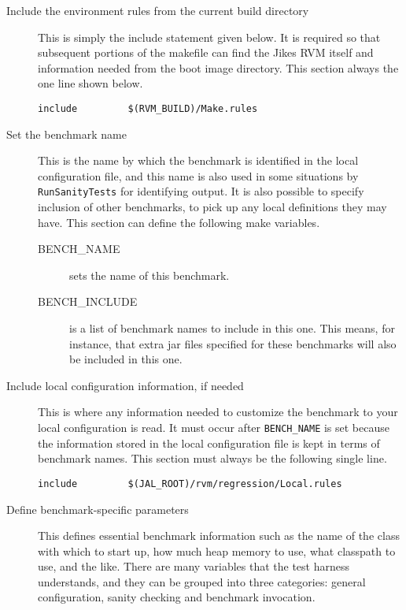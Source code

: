 \begin{description}
\item[Include the environment rules from the current build directory]
This is simply the include statement given below.  It is required so
that subsequent portions of the makefile can find the Jikes RVM itself
and information needed from the boot image directory.  This section
always the one line shown below.
\begin{verbatim}
include         $(RVM_BUILD)/Make.rules
\end{verbatim}

\item[Set the benchmark name] This is the name by which the benchmark
is identified in the local configuration file, and this name is also
used in some situations by {\tt{RunSanityTests}} for identifying
output.  It is also possible to specify inclusion of other benchmarks,
to pick up any local definitions they may have.  This section can
define the following make variables.
\begin{description}
\item[BENCH\_NAME] sets the name of this benchmark.  
\item[BENCH\_INCLUDE] is a list of benchmark names to include in this
one.  This means, for instance, that extra jar files specified for
these benchmarks will also be included in this one.
\end{description}

\item[Include local configuration information, if needed] This is
where any information needed to customize the benchmark to your local
configuration is read.  It must occur after {\tt{BENCH\_NAME}} is set
because the information stored in the local configuration file is kept
in terms of benchmark names.  This section must always be the
following single line.
\begin{verbatim}
include         $(JAL_ROOT)/rvm/regression/Local.rules
\end{verbatim}

\item[Define benchmark-specific parameters]  This defines essential
benchmark information such as the name of the class with which to
start up, how much heap memory to use, what classpath to use, and the
like.  There are many variables that the test harness understands, and
they can be grouped into three categories: general configuration,
sanity checking and benchmark invocation.


\end{description}
